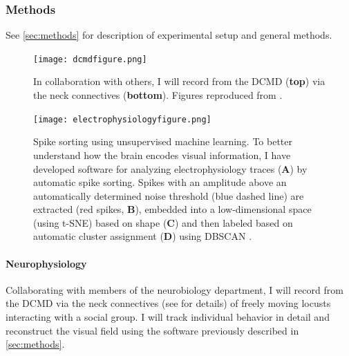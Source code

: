 \documentclass[11pt,a4paper,oneside]{article}
\begin{document}
\subsubsection{Methods}

See \ref{sec:methods} for description of experimental setup and general methods.
\begin{figure}
	\begin{center}
		\texttt{[image: dcmdfigure.png]}\\
	\end{center}
	\begin{flushleft}
		\caption{In collaboration with others, I will record from the DCMD (\textbf{top}) via the neck connectives (\textbf{bottom}). Figures reproduced from \citealp{berman2013neural,gabbiani2002multiplicative}.  \label{fig:dcmd}} 
	\end{flushleft}
\end{figure} 

\begin{figure}
	\begin{center}
		\texttt{[image: electrophysiologyfigure.png]}\\
	\end{center}
	\begin{flushleft}
		\caption{Spike sorting using unsupervised machine learning. To better understand how the brain encodes visual information, I have developed software for analyzing electrophysiology traces (\textbf{A}) by automatic spike sorting. Spikes with an amplitude above an automatically determined noise threshold (blue dashed line) are extracted (red spikes, \textbf{B}), embedded into a low-dimensional space (using t-SNE) based on shape (\textbf{C}) and then labeled based on automatic cluster assignment (\textbf{D}) using DBSCAN \citep{ester1996density}. \label{fig:ephys}} 
	\end{flushleft}
\end{figure} 

\paragraph{Neurophysiology}
Collaborating with members of the neurobiology department, I will record from the DCMD via the neck connectives (see \citealp{williamson1982large,berman2013neural} for details) of freely moving locusts interacting with a social group. I will track individual behavior in detail and reconstruct the visual field using the software previously described in \ref{sec:methods}. 
\end{document}
